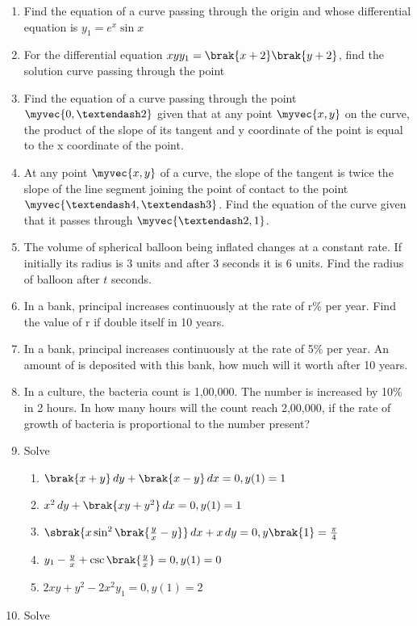 \begin{enumerate}[label=\arabic*.,ref=\thesubsection.\theenumi]
\begin{enumerate}[label = (\roman*)]
\end{enumerate}
%
\item Find the equation of a curve passing through the origin and whose differential equation is $y_1 = e^x \sin x$
%
\item For the differential equation $xy y_1 = \brak{x+2}\brak{y+2}$, find the solution curve passing through the point 
%
\item Find the equation of a curve passing through the point $\myvec{0, –2}$ given that at any point $\myvec{x, y}$ on the curve, the product of the slope of its tangent and y coordinate of the point is equal to the x coordinate of the point.
\item At any point $\myvec{x, y}$ of a curve, the slope of the tangent is twice the slope of the line segment joining the point of contact to the point $\myvec{– 4, –3}$. Find the equation of the curve given that it passes through $\myvec{–2, 1}$.
\item The volume of spherical balloon being inflated changes at a constant rate. If initially its radius is 3 units and after 3 seconds it is 6 units. Find the radius of balloon after $t$ seconds.
\item In a bank, principal increases continuously at the rate of r\% per year. Find the value of r if  double itself in 10 years. 
\item In a bank, principal increases continuously at the rate of 5\% per year. An amount of  is deposited with this bank, how much will it worth after 10 years.
\item In a culture, the bacteria count is 1,00,000. The number is increased by 10\% in 2 hours. In how many hours will the count reach 2,00,000, if the rate of growth of bacteria is proportional to the number present?
\item Solve
\begin{enumerate}[label=(\roman*)]
%
\item  $\brak{x+y}\, dy + \brak{x-y}\, dx = 0, y(1) = 1$
\item  $x^2\, dy + \brak{xy+y^2}\, dx = 0, y(1) = 1$
\item  $\sbrak{x\sin^2\brak{\frac{y}{x}-y}}\, dx + x\, dy = 0, y\brak{1} = \frac{\pi}{4}$
\item  $y_1 - \frac{y}{x} + \csc \brak{\frac{y}{x}} = 0, y(1) = 0$
\item  $2xy+y^2-2x^2y_1  = 0, y(1) = 2$
\end{enumerate}
\item Solve

\end{enumerate}
